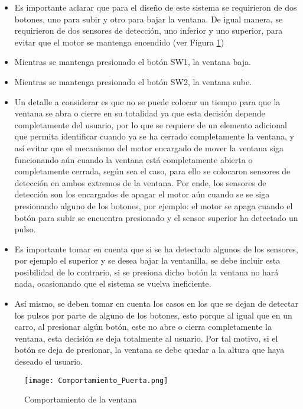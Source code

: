 \documentclass{article}
\begin{document}
\begin{itemize}
    \item Es importante aclarar que para el diseño de este sistema se requirieron de dos botones, uno para subir y otro para bajar la ventana. De igual manera, se requirieron de dos sensores de detección, uno inferior y uno superior, para evitar que el motor se mantenga encendido (ver Figura \ref{fig:Comportamiento_Ventana})
    \item Mientras se mantenga presionado el botón SW1, la ventana baja.
    \item Mientras se mantenga presionado el botón SW2, la ventana sube.
    \item Un detalle a considerar es que no se puede colocar un tiempo para que la ventana se abra o cierre en su totalidad ya que esta decisión depende completamente del usuario, por lo que se requiere de un elemento adicional que permita identificar cuando ya se ha cerrado completamente la ventana, y así evitar que el mecanismo del motor encargado de mover la ventana siga funcionando aún cuando la ventana está completamente abierta o completamente cerrada, según sea el caso, para ello se colocaron sensores de detección en ambos extremos de la ventana. Por ende, los sensores de detección son los encargados de apagar el motor aún cuando se se siga presionando alguno de los botones, por ejemplo: el motor se apaga cuando el botón para subir se encuentra presionado y el sensor superior ha detectado un pulso.
    \item Es importante tomar en cuenta que si se ha detectado algunos de los sensores, por ejemplo el superior y se desea bajar la ventanilla, se debe incluir esta posibilidad de lo contrario, si se presiona dicho botón la ventana no hará nada, ocasionando que el sistema se vuelva ineficiente.
    \item Así mismo, se deben tomar en cuenta los casos en los que se dejan de detectar los pulsos por parte de alguno de los botones, esto porque al igual que en un carro, al presionar algún botón, este no abre o cierra completamente la ventana, esta decisión se deja totalmente al usuario. Por tal motivo, si el botón se deja de presionar, la ventana se debe quedar a la altura que haya deseado el usuario.
\end{itemize}
\begin{figure}[h!]
        \centering
        \texttt{[image: Comportamiento\_Puerta.png]}
        \caption{\label{fig:Comportamiento_Ventana}Comportamiento de la ventana}
    \end{figure}
\end{document}
